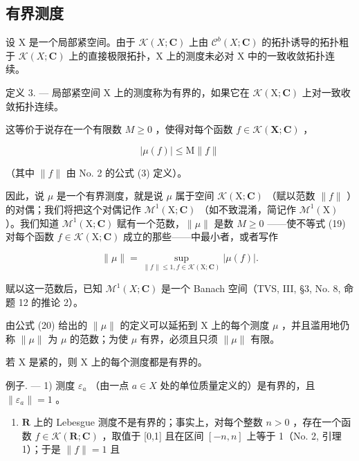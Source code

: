 \subsection{有界测度}

设 X 是一个局部紧空间。由于 \(\mathcal{K}(X;\mathbf{C})\) 上由 \(\mathcal{C}^{b}(X;\mathbf{C})\) 的拓扑诱导的拓扑粗于 \(\mathcal{K}(X;\mathbf{C})\) 上的直接极限拓扑，X 上的测度未必对 X 中的一致收敛拓扑连续。

定义 3. --- 局部紧空间 X 上的测度称为有界的，如果它在 \(\mathcal{K}(\mathrm{X};\mathbf{C})\) 上对一致收敛拓扑连续。

这等价于说存在一个有限数 \(M \geqslant 0\) ，使得对每个函数 \(f \in \mathcal{K}(\mathbf{X}; \mathbf{C})\) ，

\[
| \mu (f) | \leqslant \mathrm{M} \| f \|\tag{19}
\]

（其中 \(\| f\|\) 由 No. 2 的公式 (3) 定义）。

因此，说 \(\mu\) 是一个有界测度，就是说 \(\mu\) 属于空间 \(\mathcal{K}(\mathrm{X};\mathbf{C})\) （赋以范数 \(\| f\|\) ）的对偶；我们将把这个对偶记作 \(\mathcal{M}^1 (\mathrm{X};\mathbf{C})\) （如不致混淆，简记作 \(\mathcal{M}^1 (\mathrm{X})\) ）。我们知道 \(\mathcal{M}^1 (\mathrm{X};\mathbf{C})\) 赋有一个范数，\(\| \mu \|\) 是数 \(M\geqslant 0\) ——使不等式 (19) 对每个函数 \(f\in \mathcal{K}(\mathrm{X};\mathbf{C})\) 成立的那些——中最小者，或者写作

\[
\| \mu \| = \sup _ {\| f \| \leqslant 1, f \in \mathcal{K} (\mathrm{X}; \mathbf {C})} | \mu (f) |.\tag{20}
\]

赋以这一范数后，已知 \(\mathcal{M}^{1}(X;\mathbf{C})\) 是一个 Banach 空间（TVS, III, §3, No. 8, 命题 12 的推论 2）。

由公式 (20) 给出的 \(\|\mu\|\) 的定义可以延拓到 X 上的每个测度 \(\mu\) ，并且滥用地仍称 \(\|\mu\|\) 为 \(\mu\) 的范数；为使 \(\mu\) 有界，必须且只须 \(\|\mu\|\) 有限。

若 X 是紧的，则 X 上的每个测度都是有界的。

例子. --- 1) 测度 \(\varepsilon_{a}\) （由一点 \(a \in X\) 处的单位质量定义的）是有界的，且 \(\| \varepsilon_{a} \| = 1\) 。

\begin{enumerate}
\def\labelenumi{\arabic{enumi})}
\setcounter{enumi}{1}
\tightlist
\item
  \(\mathbf{R}\) 上的 Lebesgue 测度不是有界的；事实上，对每个整数 \(n > 0\) ，存在一个函数 \(f \in \mathcal{K}(\mathbf{R}; \mathbf{C})\) ，取值于 {[}0,1{]} 且在区间 \([-n, n]\) 上等于 1（No. 2, 引理 1）；于是 \(\| f \| = 1\) 且
\end{enumerate}

